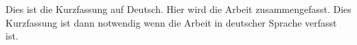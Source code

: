 Dies ist die Kurzfassung auf Deutsch. Hier wird die Arbeit zusammengefasst.
Dies Kurzfassung ist dann notwendig wenn die Arbeit in deutscher Sprache verfasst ist.